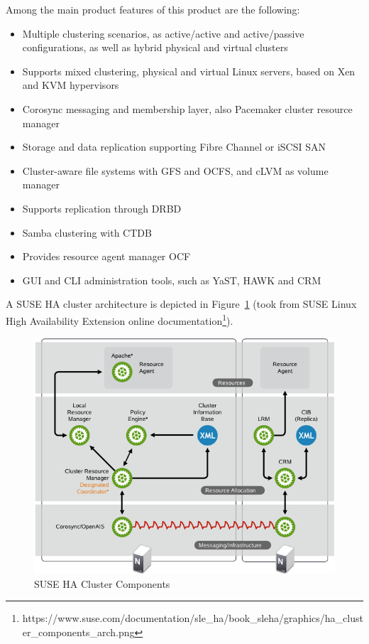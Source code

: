 \documentclass[a4paper, 12pt]{book}
\begin{document}
\noindent Among the main product features of this product are the following:

\begin{itemize}
	\item Multiple clustering scenarios, as active/active and active/passive configurations, as well as hybrid physical and virtual clusters
	\item Supports mixed clustering, physical and virtual Linux servers, based on Xen and KVM hypervisors
	\item Corosync messaging and membership layer, also Pacemaker cluster resource manager
	\item Storage and data replication supporting Fibre Channel or iSCSI SAN
	\item Cluster-aware file systems with GFS and OCFS, and cLVM as volume manager
	\item Supports replication through DRBD
	\item Samba clustering with CTDB
	\item Provides resource agent manager OCF
	\item GUI and CLI administration tools, such as YaST, HAWK and CRM
\end{itemize}

\noindent A SUSE HA cluster architecture is depicted in Figure~\ref{fig:suseha} (took from SUSE Linux High Availability Extension online documentation\footnote{https://www.suse.com/documentation/sle\_ha/book\_sleha/graphics/ha\_cluster\_components\_arch.png}).

\begin{figure}[H]
  \centering
  \includegraphics[scale=0.50]{suse-ha.png}
  \caption[SUSE HA Cluster Components]{SUSE HA Cluster Components}
  \label{fig:suseha}
\end{figure}
\end{document}
